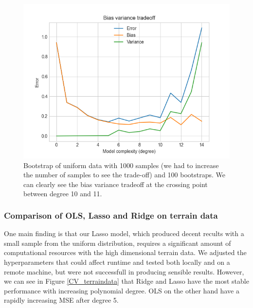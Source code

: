 \begin{figure}[H]
     \includegraphics[width=15cm]{Images/uniform_1000_bootstrap.png}
     \caption{Bootstrap of uniform data with 1000 samples (we had to increase the number of samples to see the trade-off) and 100 bootstraps. We can clearly see the bias variance tradeoff at the crossing point between degree 10 and 11.}
     \label{fig:bootstrap1000samples}
\end{figure}

\subsubsection{Comparison of OLS, Lasso and Ridge on terrain data}

One main finding is that our Lasso model, which produced decent recults with a small sample from the uniform distribution, requires a significant amount of computational resources with the high dimensional terrain data. We adjusted the hyperparameters that could affect runtime and tested both locally and on a remote machine, but were not successfull in producing sensible results. However, we can see in Figure \ref{CV_terraindata} that Ridge and Lasso have the most stable performance  with increasing polynomial degree. OLS on the other hand have a rapidly increasing MSE after degree 5. 

